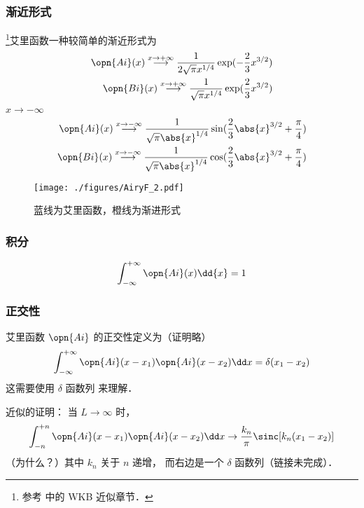 \subsubsection{渐近形式}
\footnote{参考 \cite{GriffQ} 中的 WKB 近似章节．}艾里函数一种较简单的渐近形式为
\begin{align}
\opn{Ai}(x) \overset{x \to +\infty}{\longrightarrow} \frac{1}{2\sqrt{\pi} x^{1/4}} \exp(-\frac{2}{3}x^{3/2})\\
\opn{Bi}(x) \overset{x \to +\infty}{\longrightarrow} \frac{1}{\sqrt{\pi} x^{1/4}} \exp(\frac{2}{3}x^{3/2})
\end{align}
$x \to -\infty$
\begin{align}
\opn{Ai}(x) \overset{x \to -\infty}{\longrightarrow} \frac{1}{\sqrt{\pi} \abs{x}^{1/4}} \sin(\frac{2}{3}\abs{x}^{3/2}+\frac{\pi}{4})\\
\opn{Bi}(x) \overset{x \to -\infty}{\longrightarrow} \frac{1}{\sqrt{\pi} \abs{x}^{1/4}} \cos(\frac{2}{3}\abs{x}^{3/2}+\frac{\pi}{4})
\end{align}
\begin{figure}[ht]
\centering
\texttt{[image: ./figures/AiryF\_2.pdf]}
\caption{蓝线为艾里函数，橙线为渐进形式} \label{AiryF_fig2}
\end{figure}

\subsubsection{积分}
\begin{equation}
\int_{-\infty}^{+\infty} \opn{Ai}(x) \dd{x} = 1
\end{equation}

\subsubsection{正交性}
艾里函数 $\opn{Ai}$ 的正交性定义为（证明略）
\begin{equation}
\int_{-\infty}^{+\infty} \opn{Ai}(x-x_1)\opn{Ai}(x-x_2)\dd x=\delta(x_1-x_2)
\end{equation}
这需要使用 $\delta$ 函数列 来理解．

近似的证明： 当 $L\to \infty$ 时，
\begin{equation}
\int_{-n}^{+n} \opn{Ai}(x-x_1)\opn{Ai}(x-x_2)\dd x \to \frac{k_n}{\pi}\sinc[k_n (x_1 - x_2)]
\end{equation}
（为什么？）其中 $k_n$ 关于 $n$ 递增， 而右边是一个 $\delta$ 函数列（链接未完成）．

